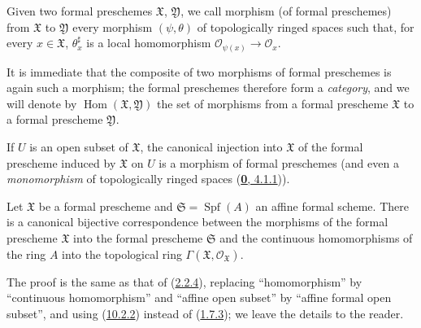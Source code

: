 \begin{definition}[10.4.5]
\label{I.10.4.5}
Given two formal preschemes $\mathfrak{X}$, $\mathfrak{Y}$, we call
morphism (of formal preschemes) from $\mathfrak{X}$ to
$\mathfrak{Y}$ every morphism $(\psi,\theta)$ of topologically ringed
spaces such that, for every $x\in\mathfrak{X}$, $\theta_x^\sharp$ is a
local homomorphism
$\mathscr{O}_{\psi(x)}\to\mathscr{O}_x$.
\end{definition}

It is immediate that the composite of two morphisms of formal preschemes is
again such a morphism; the formal preschemes therefore form a
\emph{category}, and we will denote by
$\operatorname{Hom}(\mathfrak{X},\mathfrak{Y})$ the set of morphisms
from a formal prescheme $\mathfrak{X}$ to a formal prescheme
$\mathfrak{Y}$.

If $U$ is an open subset of $\mathfrak{X}$, the canonical injection
into $\mathfrak{X}$ of the formal prescheme induced by $\mathfrak{X}$ on $U$
is a morphism of formal preschemes (and even a
\emph{monomorphism} of topologically ringed spaces
(\hyperref[0.4.1.1]{\textbf{0}, 4.1.1})).

\begin{proposition}[10.4.6]
\label{I.10.4.6}
Let $\mathfrak{X}$ be a formal prescheme and
$\mathfrak{S}=\operatorname{Spf}(A)$ an affine formal scheme. There is
a canonical bijective correspondence between the morphisms of the formal
prescheme $\mathfrak{X}$ into the formal prescheme $\mathfrak{S}$ and the
continuous homomorphisms of the ring $A$ into the topological ring
$\Gamma(\mathfrak{X},\mathscr{O}_{\mathfrak{X}})$.
\end{proposition}

The proof is the same as that of
(\hyperref[I.2.2.4]{2.2.4}), replacing ``homomorphism'' by
``continuous homomorphism'' and ``affine open subset'' by ``affine formal
open subset'', and using (\hyperref[I.10.2.2]{10.2.2}) instead of
(\hyperref[I.1.7.3]{1.7.3}); we leave the details to the reader.

